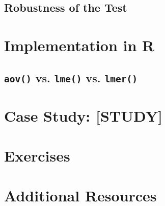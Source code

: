 \subsection{Robustness of the Test}

\section{Implementation in R}

\subsection{\verb|aov()| vs. \verb|lme()| vs. \verb|lmer()|}

\section{Case Study: [STUDY]}

\section{Exercises}

\section{Additional Resources}

